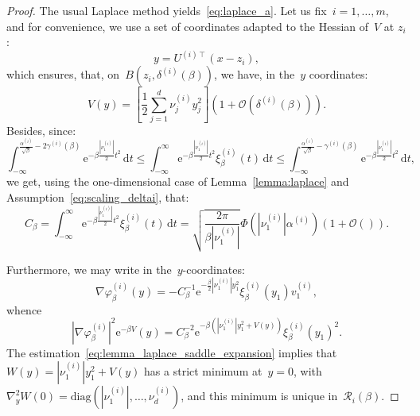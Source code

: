 \documentclass[10pt]{article}
\renewcommand{\d}{\mathrm{d}}
\newcommand{\e}{\mathrm{e}}
\newcommand{\1}{\mathbbm 1}
\newcommand{\deltaRadius}[1]{\delta^{(#1)}} %
\newcommand{\epsLimit}[1]{\alpha^{(#1)}} %
\newcommand{\gammaPerturbation}[1]{\gamma^{(#1)}}
\newcommand{\localCuboid}[1]{\mathcal R_{#1}}
\newcommand{\hessPassage}[2][]{U^{(#2)#1}} %
\newcommand{\hessEigvec}[2]{v^{(#1)}_{#2}} %
\newcommand{\hessEigval}[2]{\nu^{(#1)}_{#2}} %
\newcommand{\fineCutoff}[1]{\xi_\beta^{(#1)}}
\renewcommand{\O}{\mathcal{O}}
\begin{document}
        \begin{proof}
            The usual Laplace method yields~\eqref{eq:laplace_a}.
            Let us fix~$i=1,\dots,m$, and for convenience, we use a set of coordinates adapted to the Hessian of~$V$ at $z_i$:
            \[y = \hessPassage[\intercal]{i}(x-z_i),\]
            which ensures, that, on~$B(z_i,\deltaRadius{i}(\beta))$, we have, in the~$y$ coordinates:
            \begin{equation}
                \label{eq:lemma_laplace_saddle_expansion}
                V(y) =\left[\frac12\sum_{j=1}^d \hessEigval{i}{j}y_j^2\right]\left(1+\O(\deltaRadius{i}(\beta))\right).
            \end{equation}
            Besides, since:
            \begin{equation}
                \label{eq:lemma_laplace_tmp}
            \int_{-\infty}^{\frac{\epsLimit{i}}{\sqrt\beta}-2\gammaPerturbation{i}(\beta)}\e^{-\beta \frac{|\hessEigval{i}{1}|}{2}t^2}\,\d t\leq \int_{-\infty}^\infty \e^{-\beta \frac{|\hessEigval{i}{1}|}{2}t^2} \fineCutoff{i}(t)\,\d t \leq \int_{-\infty}^{\frac{\epsLimit{i}}{\sqrt\beta}-\gammaPerturbation{i}(\beta)} \e^{-\beta \frac{|\hessEigval{i}{1}|}{2}t^2}\,\d t,
            \end{equation}
            we get, using the one-dimensional case of Lemma~\ref{lemma:laplace} and Assumption~\eqref{eq:scaling_deltai}, that:
            \begin{equation}
                \label{eq:lemma_laplace_d_beta_estimation}
                C_\beta = \int_{-\infty}^\infty \e^{-\beta \frac{|\hessEigval{i}{1}|}{2}t^2} \fineCutoff{i}(t)\,\d t = \sqrt{\frac{2\pi}{\beta|\hessEigval{i}{1}|}}\Phi(|\hessEigval{i}{1}|\epsLimit{i})\left(1+\O()\right).
            \end{equation}

            Furthermore, we may write in the~$y$-coordinates:
            \[\nabla \varphi_\beta^{(i)}(y) = -C_\beta^{-1}\e^{-\frac{\beta}2|\hessEigval{i}{1}|y_1^2}\fineCutoff{i}(y_1)\hessEigvec{i}{1},\]
            whence
            \[|\nabla\varphi_\beta^{(i)}|^2\e^{-\beta V}(y) = C_\beta^{-2}\e^{-\beta\left(|\hessEigval{i}{1}|y_1^2+ V(y)\right)}\fineCutoff{i}(y_1)^2.\]
            The estimation~\eqref{eq:lemma_laplace_saddle_expansion} implies that~$W(y)=|\hessEigval{i}{1}|y_1^2+ V(y)$ has a strict minimum at~$y=0$, with~$\nabla_y^2 W(0) = \mathrm{diag}\left(|\hessEigval{i}{1}|,\dots, \hessEigval{i}{d}\right)$, and this minimum is unique in~$\localCuboid{i}(\beta)$.


\end{proof}
\end{document}

